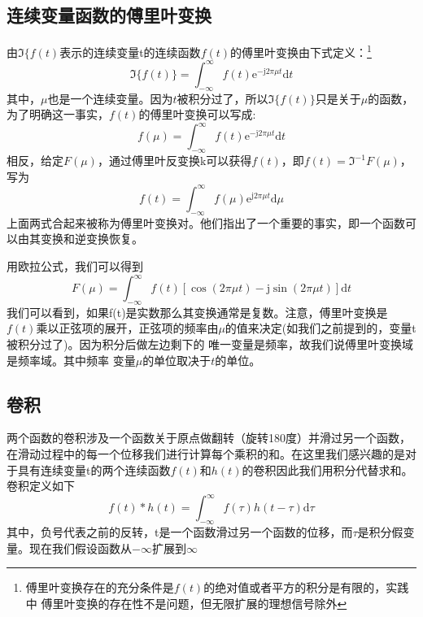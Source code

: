 \documentclass[UTF8,a4paper]{ctexart}
\begin{document}
\subsection{连续变量函数的傅里叶变换}
由$\Im\{f(t)$表示的连续变量t的连续函数$f(t)$的傅里叶变换由下式定义：\footnote{傅里叶变换存在的充分条件是$f(t)$的绝对值或者平方的积分是有限的，实践中 傅里叶变换的存在性不是问题，但无限扩展的理想信号除外}
\begin{equation}
\Im\{f(t)\}=\int_{-\infty}^{\infty} f(t) \mathrm{e}^{-\mathrm{j} 2 \pi \mu t} \mathrm{d} t
\end{equation}
其中，$\mu$也是一个连续变量。因为$t$被积分过了，所以$\Im\{f(t)\}$只是关于$\mu$的函数，为了明确这一事实，$f(t)$的傅里叶变换可以写成:
\begin{equation}
f(\mu)=\int_{-\infty}^{\infty} f(t) \mathrm{e}^{-\mathrm{j} 2 \pi \mu t} \mathrm{d} t
\end{equation}
相反，给定$F(\mu)$，通过傅里叶反变换k可以获得$f(t)$，即$f(t)=\Im^{-1}{F(\mu)}$，写为
\begin{equation}
f(t)=\int_{-\infty}^{\infty} f(\mu) \mathrm{e}^{\mathrm{j} 2 \pi \mu t} \mathrm{d} \mu
\end{equation}
上面两式合起来被称为傅里叶变换对。他们指出了一个重要的事实，即一个函数可以由其变换和逆变换恢复。\par
用欧拉公式，我们可以得到
\begin{equation}
F(\mu)=\int_{-\infty}^{\infty} f(t)[\cos (2 \pi \mu t)-\mathrm{j} \sin (2 \pi \mu t)] \mathrm{d} t
\end{equation}
我们可以看到，如果f(t)是实数那么其变换通常是复数。注意，傅里叶变换是$f(t)$乘以正弦项的展开，正弦项的频率由$\mu$的值来决定(如我们之前提到的，变量t被积分过了)。因为积分后做左边剩下的 唯一变量是频率，故我们说傅里叶变换域是频率域。其中频率  变量$\mu$的单位取决于$t$的单位。
\subsection{卷积}
两个函数的卷积涉及一个函数关于原点做翻转（旋转180度）并滑过另一个函数，在滑动过程中的每一个位移我们进行计算每个乘积的和。在这里我们感兴趣的是对于具有连续变量t的两个连续函数$f(t)$和$h(t)$的卷积因此我们用积分代替求和。卷积定义如下
\begin{equation}
f(t) * h(t)=\int_{-\infty}^{\infty} f(\tau) h(t-\tau) \mathrm{d} \tau
\end{equation}
其中，负号代表之前的反转，t是一个函数滑过另一个函数的位移，而$\tau$是积分假变量。现在我们假设函数从$-\infty$扩展到$\infty$
\end{document}
